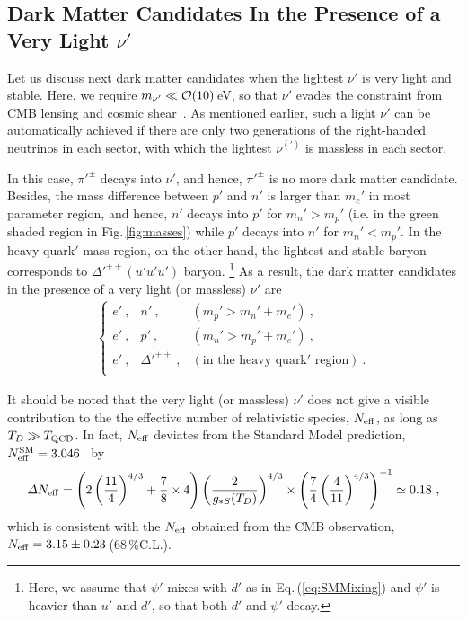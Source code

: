 \documentclass[aps,amsmath,preprint,epsf,superscriptaddress,nofootinbib,notitlepage]{revtex4-1}
\begin{document}
\subsection{Dark Matter Candidates In the Presence of a Very Light $\nu'$}
Let us discuss next dark matter candidates when the lightest $\nu'$ is very light and stable.
Here, we require $m_{\nu'} \ll {\cal O}(10)$\,eV, so that  $\nu'$ evades the constraint from CMB lensing  and cosmic shear~\cite{Osato:2016ixc}.
As mentioned earlier, such a light $\nu'$ can be automatically achieved if there are only two generations of the right-handed neutrinos in each sector,
with which the lightest $\nu^{(\prime)}$ is massless in each sector.

In this case, $\pi'^\pm$ decays into $\nu'$, and hence, $\pi'^\pm$ is no more dark matter candidate.
Besides, the mass difference between $p'$ and $n'$ 
is larger than $m_e'$ in most parameter region, and hence, $n'$ decays into $p'$ 
for $m_n' > m_p'$ (i.e. in the green shaded region in Fig.\,\ref{fig:masses})
while $p'$ decays into $n'$ for $m_n' < m_p'$.
In the heavy quark$'$ mass region, on the other hand, the lightest and stable baryon corresponds to $\Delta'^{++} (u'u'u')$ baryon.%
\footnote{Here, we assume that $\psi'$ mixes with $d'$ as in Eq.\,(\ref{eq:SMMixing}) and $\psi'$ is heavier than $u'$ and $d'$, so that both $d'$ and $\psi'$ decay.}
As a result, the dark matter candidates in the presence of a very light (or massless) $\nu'$ are
\begin{eqnarray}
\left\{
\begin{array}{lll}
e' \ ,  & n' \ ,&  (m_p' > m_n' + m_e' )\ , \\
 e' \ , & p'  \ , &  (m_n' > m_p' + m_e') \ , \\
 e' \ , & \Delta'^{++}\ ,  &  (\mbox{in the heavy quark$'$ region}) \ . \\
\end{array}
\right.
\end{eqnarray}

It should be noted that the very light (or massless) $\nu'$ does not give a  visible contribution to the 
the effective number of relativistic species, $N_{\rm eff}$, as long as $T_D \gg T_{\rm QCD}$.
In fact, $N_{\rm eff}$  deviates from the Standard Model prediction, $N_{\rm eff}^{\rm SM} = 3.046$~\cite{Mangano:2005cc}
by
\begin{eqnarray}
{\mit {\mit \Delta}} N_{\rm eff} = 
\left(
2 \left(\frac{11}{4}\right)^{4/3}
+ \frac{7}{8}\times 4
\right)\left(\frac{2}{g_{*S}(T_{D})}\right)^{4/3}
\times \left(\frac{7}{4} \left(\frac{4}{11}\right)^{4/3}
\right)^{-1} \simeq 0.18\ ,
\end{eqnarray}
which is consistent with the $N_{\rm eff}$ obtained from the CMB observation,
$N_{\rm eff} = 3.15\pm 0.23 $\,(68\,\%C.L.).
\end{document}
